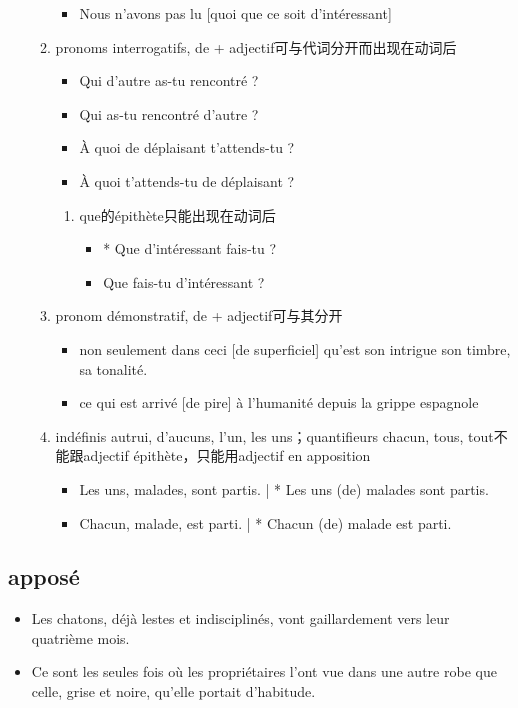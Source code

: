 \documentclass[UTF8]{report}
\begin{document}
\begin{enumerate}
\begin{enumerate}
        \begin{itemize}
            \item Nous n’avons pas lu [quoi que ce soit d’intéressant]
        \end{itemize}
        \item pronoms interrogatifs, de + adjectif可与代词分开而出现在动词后
        \begin{itemize}
            \item Qui d’autre as-tu rencontré ?
            \item Qui as-tu rencontré d’autre ?
            \item À quoi de déplaisant t’attends-tu ?
            \item À quoi t’attends-tu de déplaisant ?
        \end{itemize}
        \begin{enumerate}
            \item que的épithète只能出现在动词后
            \begin{itemize}
                \item * Que d’intéressant fais-tu ?
                \item Que fais-tu d’intéressant ?
            \end{itemize}
        \end{enumerate}
        \item pronom démonstratif, de + adjectif可与其分开
        \begin{itemize}
            \item non seulement dans ceci [de superficiel] qu’est son intrigue son timbre, sa tonalité.
            \item ce qui est arrivé [de pire] à l’humanité depuis la grippe espagnole
        \end{itemize}
        \item indéfinis autrui, d’aucuns, l’un, les uns；quantifieurs chacun, tous, tout不能跟adjectif épithète，只能用adjectif en apposition
        \begin{itemize}
            \item Les uns, malades, sont partis. | * Les uns (de) malades sont partis.
            \item Chacun, malade, est parti. | * Chacun (de) malade est parti.
        \end{itemize}
    \end{enumerate}
\end{enumerate}

\subsection{apposé}
\begin{itemize}
    \item Les chatons, déjà lestes et indisciplinés, vont gaillardement vers leur quatrième mois.
    \item Ce sont les seules fois où les propriétaires l’ont vue dans une autre robe que celle, grise et noire, qu’elle portait d’habitude.
\end{itemize}
\end{document}
